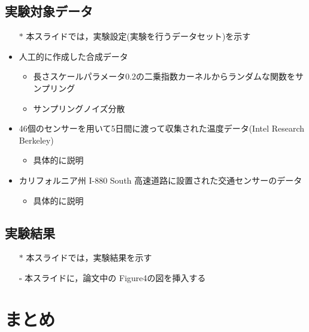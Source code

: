 \documentclass[dvipdfmx, 10.5pt]{beamer}
\begin{document}
\subsection{実験対象データ}
\begin{frame}{\insertsubsection}
	\begin{itemize}
		\item[$\ast$] 本スライドでは，実験設定(実験を行うデータセット)を示す
		\item 人工的に作成した合成データ
		\begin{itemize}
			\item 長さスケールパラメータ0.2の二乗指数カーネルからランダムな関数をサンプリング
			\item サンプリングノイズ分散
		\end{itemize}
		\item 46個のセンサーを用いて5日間に渡って収集された温度データ(Intel Research Berkeley)
		\begin{itemize}
			\item 具体的に説明
		\end{itemize}
		\item カリフォルニア州 I-880 South 高速道路に設置された交通センサーのデータ
		\begin{itemize}
			\item 具体的に説明
		\end{itemize}
	\end{itemize}

\end{frame}


\subsection{実験結果}
\begin{frame}{\insertsubsection}
	\begin{itemize}
		\item[$\ast$] 本スライドでは，実験結果を示す
		\item[$\square$] 本スライドに，論文中の Figure4の図を挿入する
	\end{itemize}

\end{frame}

\section{まとめ}
\end{document}
